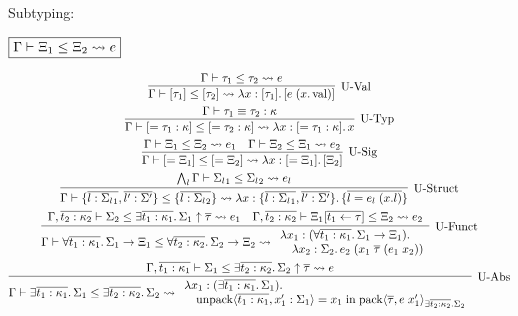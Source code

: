 Subtyping:

$\fbox{$\Gamma \vdash \Xi_1 \leq \Xi_2 \rightsquigarrow e$}$

\begin{gather*}
  \infer[\text{U-Val}]{\Gamma \vdash [\tau_1] \leq [\tau_2] \elaborate \lambda x: [\tau_1]\ldotp [e\; (x.\symval)]}{
    \Gamma \vdash \tau_1 \leq \tau_2 \elaborate e
  }
  \\
  \infer[\text{U-Typ}]{\Gamma \vdash [= \tau_1: \kappa] \leq [= \tau_2: \kappa] \elaborate \lambda x: [= \tau_1: \kappa]\ldotp x}{
    \Gamma \vdash \tau_1 \equiv \tau_2: \kappa
  }
  \\
  \infer[\text{U-Sig}]{\Gamma \vdash [= \Xi_1] \leq [= \Xi_2] \elaborate \lambda x: [= \Xi_1]\ldotp [\Xi_2]}{
    \Gamma \vdash \Xi_1 \leq \Xi_2 \elaborate e_1
    &
    \Gamma \vdash \Xi_2 \leq \Xi_1 \elaborate e_2
  }
  \\
  \infer[\text{U-Struct}]{\Gamma \vdash \{\overline{l: {\Sigma_l}_1}, \overline{l': \Sigma'}\} \leq \{\overline{l: {\Sigma_l}_2}\} \elaborate \lambda x: \{\overline{l: {\Sigma_l}_1}, \overline{l': \Sigma'}\}\ldotp \{\overline{l = e_l\; (x.l)}\}}{
    \bigwedge_l \Gamma \vdash {\Sigma_l}_1 \leq {\Sigma_l}_2 \elaborate e_l
  }
  \\
  \infer[\text{U-Funct}]{
    \Gamma \vdash \forall \overline{t_1: \kappa_1}\ldotp \Sigma_1 \to \Xi_1 \leq \forall \overline{t_2: \kappa_2}\ldotp \Sigma_2 \to \Xi_2 \elaborate
    \begin{array}{l}
      \lambda x_1: (\forall \overline{t_1: \kappa_1}\ldotp \Sigma_1 \to \Xi_1)\ldotp \\
      \hspace{1em}\lambda x_2: \Sigma_2\ldotp e_2\; (x_1\; \overline{\tau}\; (e_1\; x_2))
    \end{array}
  }{
    \Gamma, \overline{t_2: \kappa_2} \vdash \Sigma_2 \leq \exists \overline{t_1: \kappa_1}\ldotp \Sigma_1 \uparrow \overline{\tau} \elaborate e_1
    &
    \Gamma, \overline{t_2: \kappa_2} \vdash \Xi_1[\overline{t_1 \assign \tau}] \leq \Xi_2 \elaborate e_2
  }
  \\
  \infer[\text{U-Abs}]{
    \Gamma \vdash \exists \overline{t_1: \kappa_1}\ldotp \Sigma_1 \leq \exists \overline{t_2: \kappa_2}\ldotp \Sigma_2 \elaborate
    \begin{array}{l}
      \lambda x_1: (\exists \overline{t_1: \kappa_1}\ldotp \Sigma_1)\ldotp \\
      \hspace{1em}\symunpack\langle \overline{t_1: \kappa_1}, x'_1: \Sigma_1\rangle = x_1 \symin \sympack\langle \overline{\tau}, e\; x'_1\rangle_{\exists \overline{t_2: \kappa_2}\ldotp \Sigma_2}
    \end{array}
  }{
    \Gamma, \overline{t_1: \kappa_1} \vdash \Sigma_1 \leq \exists \overline{t_2: \kappa_2}\ldotp \Sigma_2 \uparrow \overline{\tau} \elaborate e
  }
\end{gather*}

